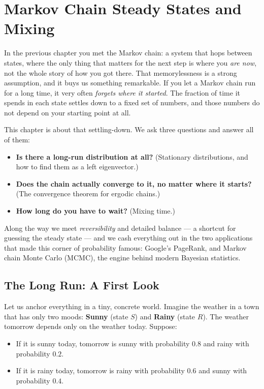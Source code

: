 \chapter{Markov Chain Steady States and Mixing}

In the previous chapter you met the Markov chain: a system that hops between
states, where the only thing that matters for the next step is where you
\emph{are now}, not the whole story of how you got there. That memorylessness is
a strong assumption, and it buys us something remarkable. If you let a Markov
chain run for a long time, it very often \emph{forgets where it started}. The
fraction of time it spends in each state settles down to a fixed set of numbers,
and those numbers do not depend on your starting point at all.

This chapter is about that settling-down. We ask three questions and answer
all of them:

\begin{itemize}
  \item \textbf{Is there a long-run distribution at all?} (Stationary
    distributions, and how to find them as a left eigenvector.)
  \item \textbf{Does the chain actually converge to it, no matter where it
    starts?} (The convergence theorem for ergodic chains.)
  \item \textbf{How long do you have to wait?} (Mixing time.)
\end{itemize}

Along the way we meet \emph{reversibility} and detailed balance --- a
shortcut for guessing the steady state --- and we cash everything
out in the two applications that made this corner of probability famous: Google's
PageRank, and Markov chain Monte Carlo (MCMC), the engine behind modern Bayesian
statistics.

\chapterline

\section{The Long Run: A First Look}
\label{ch24:longrun}

Let us anchor everything in a tiny, concrete world. Imagine the weather in a town
that has only two moods: \textbf{Sunny} (state $S$) and \textbf{Rainy} (state
$R$). The weather tomorrow depends only on the weather today. Suppose:

\begin{itemize}
  \item If it is sunny today, tomorrow is sunny with probability $0.8$ and rainy
    with probability $0.2$.
  \item If it is rainy today, tomorrow is rainy with probability $0.6$ and sunny
    with probability $0.4$.
\end{itemize}


